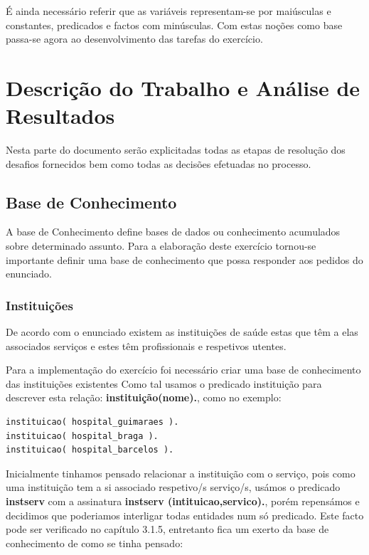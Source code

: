 É ainda necessário referir que as variáveis representam-se por maiúsculas e constantes, predicados e factos com minúsculas.
Com estas noções como base passa-se agora ao desenvolvimento das tarefas do exercício.



\chapter{Descrição do Trabalho e Análise de Resultados}
\label{cap:p3}

Nesta parte do documento serão explicitadas todas as etapas de resolução dos desafios fornecidos bem como todas as decisões efetuadas no processo.


\section{Base de Conhecimento}
\label{p3:baseConhe}

A base de Conhecimento define bases de dados ou conhecimento acumulados sobre determinado assunto.
Para a elaboração deste exercício tornou-se importante definir uma base de conhecimento
que possa responder aos pedidos do enunciado.

\subsection{Instituições}

De acordo com o enunciado existem as instituições de saúde estas que têm a elas associados serviços e estes têm profissionais e respetivos utentes. 

Para a implementação do exercício foi necessário criar uma base de conhecimento das instituições existentes 
Como tal usamos o predicado instituição para descrever esta relação: \textbf{instituição(nome).}, como no exemplo: 

\begin{verbatim}
instituicao( hospital_guimaraes ). 
instituicao( hospital_braga ).
instituicao( hospital_barcelos ).
\end{verbatim}

Inicialmente tinhamos pensado relacionar a instituição com o serviço, pois como uma instituição tem a si associado respetivo/s serviço/s, usámos o predicado \textbf{instserv} com a  assinatura \textbf{instserv (intituicao,servico).}, porém repensámos e decidimos que poderiamos interligar todas entidades num só predicado. Este facto pode ser verificado no capítulo 3.1.5, entretanto fica um exerto da base de conhecimento de como se tinha pensado: 

